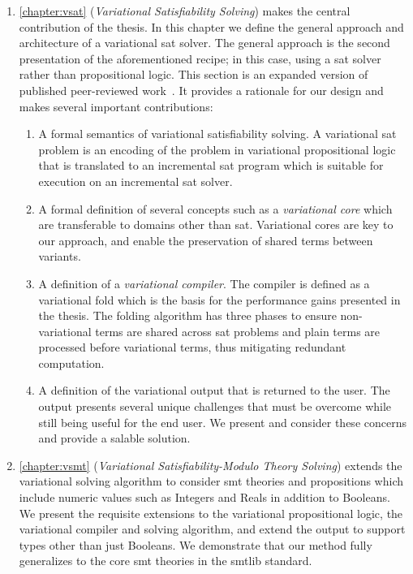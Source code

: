 \begin{enumerate}
  \item \autoref{chapter:vsat} (\emph{Variational Satisfiability Solving}) makes
    the central contribution of the thesis. In this chapter we define the
    general approach and architecture of a variational \ac{sat} solver. The
    general approach is the second presentation of the aforementioned recipe; in
    this case, using a \ac{sat} solver rather than propositional logic. This
    section is an expanded version of published peer-reviewed
    work~\cite{YWT:SPLC20}. It provides a rationale for our design and makes
    several important contributions:
    \begin{enumerate}
    \item A formal semantics of variational satisfiability solving. A
      variational \ac{sat} problem is an encoding of the problem in variational
      propositional logic that is translated to an incremental \ac{sat} program
      which is suitable for execution on an incremental \ac{sat} solver.
    \item A formal definition of several concepts such as a \emph{variational
        core} which are transferable to domains other than \ac{sat}. Variational
      cores are key to our approach, and enable the preservation of shared terms
      between variants.
    \item A definition of a \emph{variational compiler}. The compiler is defined
      as a variational fold which is the basis for the performance gains
      presented in the thesis. The folding algorithm has three phases to ensure
      non-variational terms are shared across \ac{sat} problems and plain terms
      are processed before variational terms, thus mitigating redundant
      computation.
    \item A definition of the variational output that is returned to the user.
      The output presents several unique challenges that must be overcome while
      still being useful for the end user. We present and consider these
      concerns and provide a salable solution.
    \end{enumerate}

  \item \autoref{chapter:vsmt} (\emph{Variational Satisfiability-Modulo Theory
      Solving}) extends the variational solving algorithm to consider \ac{smt}
    theories and propositions which include numeric values such as Integers and
    Reals in addition to Booleans. We present the requisite extensions to the
    variational propositional logic, the variational compiler and solving
    algorithm, and extend the output to support types other than just Booleans.
    We demonstrate that our method fully generalizes to the core \ac{smt}
    theories in the \acl{smtlib} standard.


\end{enumerate}
